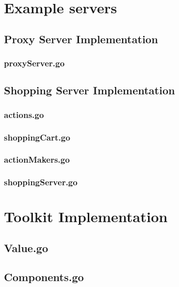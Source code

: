\begin{appendices}
\section{Example servers}

\subsection{Proxy Server Implementation}
\subsubsection{proxyServer.go}


\newpage
\subsection{Shopping Server Implementation}
\subsubsection{actions.go}

\subsubsection{shoppingCart.go}

\subsubsection{actionMakers.go}

\newpage
\subsubsection{shoppingServer.go}


\newpage
\section{Toolkit Implementation}
\subsection{Value.go}


\subsection{Components.go}



\end{appendices}
